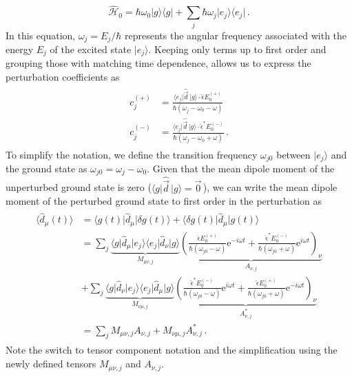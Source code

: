 \documentclass[../Thesis-IJspeert.tex]{subfiles}
\begin{document}
\begin{equation}
	\hat{\mathcal{H}}_0=\hbar\omega_0\vert g \rangle \langle g \vert + \sum_j \hbar \omega_j \vert e_j \rangle \langle e_j \vert \,.
\end{equation}
In this equation, $\omega_j=E_j/\hbar$ represents the angular frequency associated with the energy $E_j$ of the excited state $\vert e_j \rangle$. Keeping only terms up to first order and grouping those with matching time dependence, allows us to express the perturbation coefficients as
\begin{align}
\begin{split}
c_j^{(+)} &= \frac{\langle e_j \vert \hat{\vec{d}}\, \vert g \rangle \cdot \hat{\epsilon} E_0^{(+)}}{\hbar(\omega_{j}-\omega_0-\omega)} \\ 
c_j^{(-)} &= \frac{\langle e_j \vert \hat{\vec{d}}\, \vert g \rangle \cdot \hat{\epsilon}^* E_0^{(-)}}{\hbar(\omega_{j}-\omega_0+\omega)} \,.
\end{split}
\end{align}
To simplify the notation, we define the transition frequency $\omega_{j0}$ between $\vert e_j \rangle$ and the ground state as $\omega_{j0}=\omega_j-\omega_0$. Given that the mean dipole moment of the unperturbed ground state is zero ($\langle g \vert \hat{\vec{d}} \, \vert g \rangle= \vec{0}\,$), we can write the mean dipole moment of the perturbed ground state to first order in the perturbation as
\begin{align}
\label{equationdipolemomentexpectationvalue}
\begin{split}
	\langle \hat{d}_\mu (t) \rangle &= \langle g(t) \vert \hat{d}_\mu \vert \delta g(t) \rangle + \langle \delta g(t) \vert \hat{d}_\mu \vert g(t) \rangle \\ &= \sum_j \underbrace{ \langle g \vert \hat{{d}}_\mu \vert e_j \rangle \langle e_j \vert \hat{{d}}_\nu \vert g \rangle }_{M_{\mu\nu,j}} \underbrace{ \left( \frac{\hat{\epsilon} E_0^{(+)}}{\hbar(\omega_{j0} - \omega)}\mathrm{e}^{-i\omega t} + \frac{\hat{\epsilon}^* E_0^{(-)}}{\hbar ( \omega_{j0} + \omega)} \mathrm{e}^{i\omega t} \right)_{\!\nu} }_{A_{\nu,j}} \\ &+ \sum_j \underbrace{  \langle g \vert \hat{{d}}_\nu \vert e_j \rangle \langle e_j \vert \hat{{d}}_\mu \vert g \rangle }_{M_{\nu\mu,j}} \underbrace{ \left( \frac{\hat{\epsilon}^* E_0^{(-)}}{\hbar(\omega_{j0} - \omega)}\mathrm{e}^{i\omega t} + \frac{\hat{\epsilon} E_0^{(+)}}{\hbar ( \omega_{j0} + \omega)} \mathrm{e}^{-i\omega t} \right)_{\!\nu} }_{A^*_{\nu,j}} \\ &= \sum_j M_{\mu\nu,j} A_{\nu,j} + M_{\nu\mu,j} A_{\nu,j}^* \,.
\end{split}
\end{align}
Note the switch to tensor component notation and the simplification using the newly defined tensors $M_{\mu\nu,j}$ and $A_{\nu,j}$.
\end{document}
